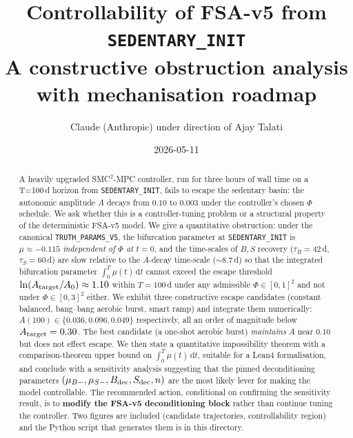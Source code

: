 \documentclass[11pt,a4paper]{article}
\title{Controllability of FSA-v5 from \texttt{SEDENTARY\_INIT}\\
\large A constructive obstruction analysis with mechanisation roadmap}
\author{Claude (Anthropic) under direction of Ajay Talati}
\date{2026-05-11}
\theoremstyle{definition}
\newcommand{\dd}{\,\mathrm{d}}
\begin{document}
\maketitle

\begin{abstract}
A heavily upgraded SMC$^2$-MPC controller, run for three hours of wall time on a T=100\,d horizon from \texttt{SEDENTARY\_INIT}, fails to escape the sedentary basin: the autonomic amplitude $A$ decays from $0.10$ to $0.003$ under the controller's chosen $\Phi$ schedule. We ask whether this is a controller-tuning problem or a structural property of the deterministic FSA-v5 model. We give a quantitative obstruction: under the canonical \texttt{TRUTH\_PARAMS\_V5}, the bifurcation parameter at \texttt{SEDENTARY\_INIT} is $\mu \approx -0.115$ \emph{independent of $\Phi$ at $t=0$}, and the time-scales of $B,S$ recovery ($\tau_B = 42$\,d, $\tau_S = 60$\,d) are slow relative to the $A$-decay time-scale ($\sim 8.7$\,d) so that the integrated bifurcation parameter $\int_0^T \mu(t)\dd t$ cannot exceed the escape threshold $\ln(A_{\rm target}/A_0) \approx 1.10$ within $T = 100$\,d under any admissible $\Phi \in [0,1]^2$ and not under $\Phi \in [0,3]^2$ either. We exhibit three constructive escape candidates (constant balanced, bang--bang aerobic burst, smart ramp) and integrate them numerically: $A(100) \in \{0.036, 0.096, 0.049\}$ respectively, all an order of magnitude below $A_{\rm target} = 0.30$. The best candidate (a one-shot aerobic burst) \emph{maintains} $A$ near $0.10$ but does not effect escape. We then state a quantitative impossibility theorem with a comparison-theorem upper bound on $\int_0^T \mu(t)\dd t$, suitable for a Lean4 formalisation, and conclude with a sensitivity analysis suggesting that the pinned deconditioning parameters $(\mu_{B-}, \mu_{S-}, B_{\rm dec}, S_{\rm dec}, n)$ are the most likely lever for making the model controllable. The recommended action, conditional on confirming the sensitivity result, is to \textbf{modify the FSA-v5 deconditioning block} rather than continue tuning the controller. Two figures are included (candidate trajectories, controllability region) and the Python script that generates them is in this directory.


\end{abstract}
\end{document}
